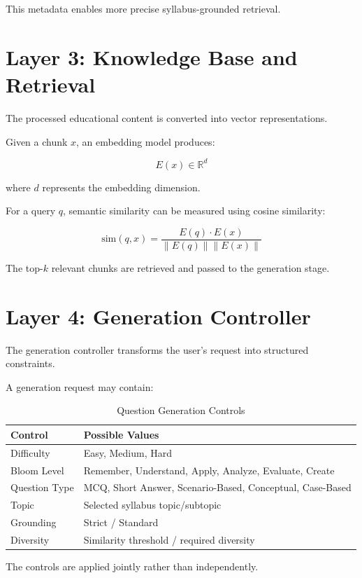 \documentclass[12pt,a4paper]{report}
\begin{document}
This metadata enables more precise syllabus-grounded retrieval.

\section{Layer 3: Knowledge Base and Retrieval}

The processed educational content is converted into vector representations.

Given a chunk $x$, an embedding model produces:

\[
E(x) \in \mathbb{R}^{d}
\]

where $d$ represents the embedding dimension.

For a query $q$, semantic similarity can be measured using cosine similarity:

\[
\text{sim}(q,x)
=
\frac{E(q)\cdot E(x)}
{\|E(q)\|\|E(x)\|}
\]

The top-$k$ relevant chunks are retrieved and passed to the generation stage.

\section{Layer 4: Generation Controller}

The generation controller transforms the user's request into structured constraints.

A generation request may contain:

\begin{table}[H]
\centering
\caption{Question Generation Controls}
\label{tab:controls}
\begin{tabularx}{\textwidth}{P{0.25\textwidth} Y}
\toprule
\textbf{Control} & \textbf{Possible Values}\\
\midrule
Difficulty & Easy, Medium, Hard\\
Bloom Level & Remember, Understand, Apply, Analyze, Evaluate, Create\\
Question Type & MCQ, Short Answer, Scenario-Based, Conceptual, Case-Based\\
Topic & Selected syllabus topic/subtopic\\
Grounding & Strict / Standard\\
Diversity & Similarity threshold / required diversity\\
\bottomrule
\end{tabularx}
\end{table}

The controls are applied jointly rather than independently.
\end{document}
